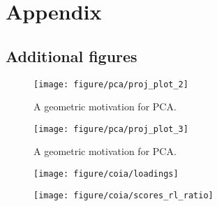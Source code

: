 \documentclass{article}
\begin{document}



\section{Appendix}

\subsection{Additional figures}

\begin{figure}
  \texttt{[image: figure/pca/proj\_plot\_2]}
  \caption{A geometric motivation for PCA.}
  \label{fig:pca-approx-2}
\end{figure}

\begin{figure}
  \texttt{[image: figure/pca/proj\_plot\_3]}
  \caption{A geometric motivation for PCA.}
  \label{fig:pca-approx-3}
\end{figure}

\begin{figure}[ht]
  \centering
  \texttt{[image: figure/coia/loadings]}
  \caption{\label{fig:coia_loadings} }
\end{figure}
\begin{figure}[ht]
  \centering
  \texttt{[image: figure/coia/scores\_rl\_ratio]}
  \caption{\label{fig:scores_rl_ratio} }
\end{figure}
\end{document}
